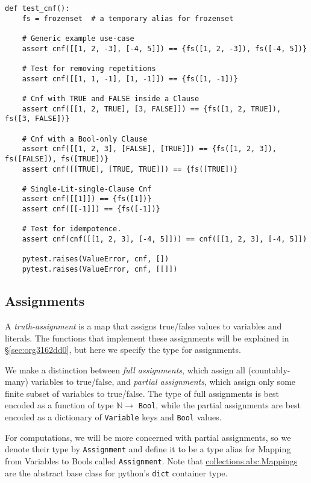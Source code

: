 \documentclass[11pt]{article}
\begin{document}
\begin{verbatim}
def test_cnf():
    fs = frozenset  # a temporary alias for frozenset

    # Generic example use-case
    assert cnf([[1, 2, -3], [-4, 5]]) == {fs([1, 2, -3]), fs([-4, 5])}

    # Test for removing repetitions
    assert cnf([[1, 1, -1], [1, -1]]) == {fs([1, -1])}

    # Cnf with TRUE and FALSE inside a Clause
    assert cnf([[1, 2, TRUE], [3, FALSE]]) == {fs([1, 2, TRUE]), fs([3, FALSE])}

    # Cnf with a Bool-only Clause
    assert cnf([[1, 2, 3], [FALSE], [TRUE]]) == {fs([1, 2, 3]), fs([FALSE]), fs([TRUE])}
    assert cnf([[TRUE], [TRUE, TRUE]]) == {fs([TRUE])}

    # Single-Lit-single-Clause Cnf
    assert cnf([[1]]) == {fs([1])}
    assert cnf([[-1]]) == {fs([-1])}

    # Test for idempotence.
    assert cnf(cnf([[1, 2, 3], [-4, 5]])) == cnf([[1, 2, 3], [-4, 5]])

    pytest.raises(ValueError, cnf, [])
    pytest.raises(ValueError, cnf, [[]])
\end{verbatim}

\subsection{Assignments}
\label{sec:org3c79422}
A \emph{truth-assignment} is a map that assigns true/false values to variables
and literals. The functions that implement these assignments will be
explained in \S \ref{sec:org3162dd0}, but here we specify the type for
assignments.

We make a distinction between \emph{full assignments}, which assign all
(countably-many) variables to true/false, and \emph{partial assignments}, which
assign only some finite subset of variables to true/false. The type of full
assignments is best encoded as a function of type \(\mathbb{N}\rightarrow\)
\texttt{Bool}, while the partial assignments are best encoded as a dictionary of
\texttt{Variable} keys and \texttt{Bool} values.

For computations, we will be more concerned with partial assignments, so we
denote their type by \texttt{Assignment} and define it to be a type alias for
Mapping from Variables to Bools called \texttt{Assignment}. Note that
\href{https://docs.python.org/3/library/collections.abc.html\#collections.abc.Mapping}{collections.abc.Mappings} are the abstract base class for python's \texttt{dict}
container type.
\end{document}
